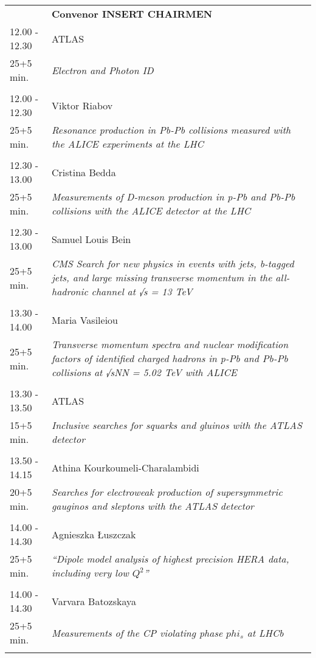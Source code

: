 \begin{longtable}{p{3cm}p{13cm}}
&\hfill {\bf Convenor INSERT CHAIRMEN }\\ 
12.00 - 12.30 & ATLAS\\ 
25+5 min. & {\it Electron and Photon ID}\\ 
 & \\ 
12.00 - 12.30 & Viktor Riabov\\ 
25+5 min. & {\it Resonance production in Pb-Pb collisions measured with the ALICE experiments at the LHC}\\ 
 & \\ 
12.30 - 13.00 & Cristina Bedda\\ 
25+5 min. & {\it Measurements of D-meson production in p-Pb and Pb-Pb collisions with the ALICE detector at the LHC}\\ 
 & \\ 
12.30 - 13.00 & Samuel Louis Bein\\ 
25+5 min. & {\it CMS Search for new physics in events with jets, b-tagged jets, and large missing transverse momentum in the all-hadronic channel at √s = 13 TeV}\\ 
 & \\ 
13.30 - 14.00 & Maria Vasileiou\\ 
25+5 min. & {\it Transverse momentum spectra and nuclear modification factors of identified charged hadrons in p-Pb and Pb-Pb collisions at √sNN  = 5.02 TeV with ALICE}\\ 
 & \\ 
13.30 - 13.50 & ATLAS\\ 
15+5 min. & {\it Inclusive searches for squarks and gluinos with the ATLAS detector}\\ 
 & \\ 
13.50 - 14.15 & Athina Kourkoumeli-Charalambidi\\ 
20+5 min. & {\it Searches for electroweak production of supersymmetric gauginos and sleptons with the ATLAS detector}\\ 
 & \\ 
14.00 - 14.30 & Agnieszka Łuszczak\\ 
25+5 min. & {\it “Dipole model analysis of highest precision HERA data, including very low $Q^2$”}\\ 
 & \\ 
14.00 - 14.30 & Varvara Batozskaya\\ 
25+5 min. & {\it Measurements of the CP violating phase $phi_s$ at LHCb}\\ 
 & \\ 

\end{longtable}
